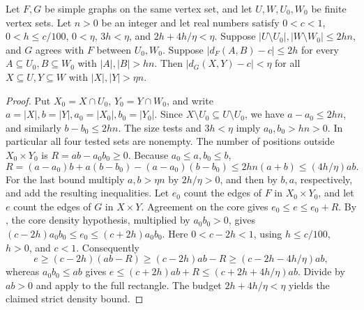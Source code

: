 \begin{lemma}
Let $F,G$ be simple graphs on the same vertex set, and let $U,W,U_0,W_0$ be finite vertex
sets. Let $n>0$ be an integer and let real numbers satisfy
$0<c<1$, $0<h\leq c/100$, $0<\eta$, $3h<\eta$, and
$2h+4h/\eta<\eta$. Suppose
$|U\setminus U_0|,|W\setminus W_0|\leq2hn$, and $G$ agrees with $F$
between $U_0,W_0$. Suppose
$|d_F(A,B)-c|\leq2h$ for every $A\subseteq U_0,B\subseteq W_0$
with $|A|,|B|>hn$.
Then $|d_G(X,Y)-c|<\eta$ for all $X\subseteq U,Y\subseteq W$
with $|X|,|Y|>\eta n$.
\end{lemma}
\begin{proof}
Put $X_0=X\cap U_0$, $Y_0=Y\cap W_0$, and write
$a=|X|,b=|Y|,a_0=|X_0|,b_0=|Y_0|$.
Since $X\setminus U_0\subseteq U\setminus U_0$, we have
$a-a_0\leq2hn$, and similarly $b-b_0\leq2hn$.
The size tests and $3h<\eta$ imply $a_0,b_0>hn>0$.
In particular all four tested sets are nonempty.
The number of positions outside $X_0\times Y_0$ is
$R=ab-a_0b_0\geq0$. Because $a_0\leq a,b_0\leq b$,
\[
R=(a-a_0)b+a(b-b_0)-(a-a_0)(b-b_0)
\leq2hn(a+b)\leq(4h/\eta)ab.
\]
For the last bound multiply $a,b>\eta n$ by $2h/\eta>0$,
and then by $b,a$, respectively, and add the resulting inequalities.
Let $e_0$ count the edges of $F$ in $X_0\times Y_0$, and let $e$ count
the edges of $G$ in $X\times Y$.
Agreement on the core gives $e_0\leq e\leq e_0+R$.
By , the core density hypothesis, multiplied by
$a_0b_0>0$, gives
$(c-2h)a_0b_0\leq e_0\leq(c+2h)a_0b_0$.
Here $0<c-2h<1$, using $h\leq c/100$, $h>0$, and $c<1$.
Consequently
\[
e\geq(c-2h)(ab-R)\geq(c-2h)ab-R
\geq(c-2h-4h/\eta)ab,
\]
whereas $a_0b_0\leq ab$ gives
$e\leq(c+2h)ab+R\leq(c+2h+4h/\eta)ab$.
Divide by $ab>0$ and apply  to the full rectangle.
The budget $2h+4h/\eta<\eta$ yields the claimed strict density bound.
\end{proof}
